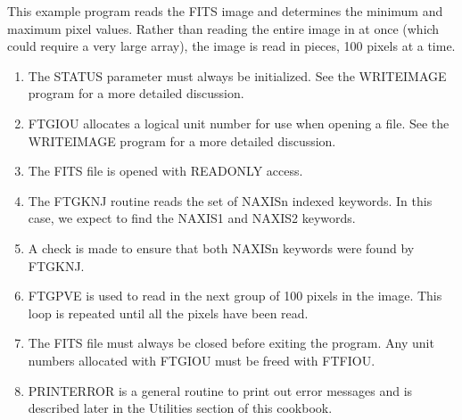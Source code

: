 This example program reads the FITS image and determines the minimum
and maximum pixel values.  Rather than reading the entire image in
at once (which could require a very large array), the image is read
in pieces, 100 pixels at a time.  

\begin{enumerate}
\item
The STATUS parameter must always be initialized.  See the WRITEIMAGE 
program for a more detailed discussion.

\item
FTGIOU allocates a logical unit number for use when opening a file.
See the WRITEIMAGE program for a more detailed discussion.
\item
The FITS file is opened with READONLY access.
\item
The FTGKNJ routine reads the set of NAXISn indexed keywords.  In this
case, we expect to find the NAXIS1 and NAXIS2 keywords.
\item
A check is made to ensure that both NAXISn keywords were found by FTGKNJ.
\item
FTGPVE is used to read in the next group of 100 pixels in the image.
This loop is repeated until all the pixels have been read.
\item
The FITS file must always be closed before exiting the program. 
Any unit numbers allocated with FTGIOU must be freed with FTFIOU.
\item
PRINTERROR is a general routine to print out error messages and is
described later in the Utilities section of this cookbook.

\end{enumerate}
\newpage
\footnotesize

